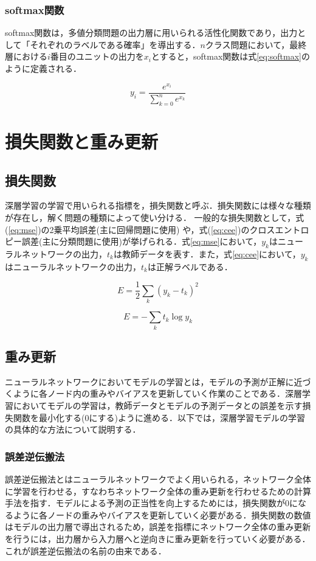 \documentclass[a4j, 11pt]{jreport}
\begin{document}
\subsubsection{softmax関数}
softmax関数は，多値分類問題の出力層に用いられる活性化関数であり，出力として「それぞれのラベルである確率」を導出する．$n$クラス問題において，最終層における$i$番目のユニットの出力を$x_{i}$とすると，softmax関数は式\ref{eq:softmax}のように定義される．

\begin{equation}
 y_{i} = \frac{e^{x_{i}}}{\sum_{k=0}^{n}e^{x_{k}}}
 \label{eq:softmax}
\end{equation}

\section{損失関数と重み更新}
\subsection{損失関数}
深層学習の学習で用いられる指標を，損失関数と呼ぶ．損失関数には様々な種類が存在し，解く問題の種類によって使い分ける．
一般的な損失関数として，式(\ref{eq:mse})の2乗平均誤差(主に回帰問題に使用) や，式(\ref{eq:cee})のクロスエントロピー誤差(主に分類問題に使用)が挙げられる．式\ref{eq:mse}において，$y_{k}$はニューラルネットワークの出力，$t_{k}$は教師データを表す．また，式\ref{eq:cee}において，$y_{k}$はニューラルネットワークの出力，$t_{k}$は正解ラベルである．

\begin{equation}
	E = \frac{1}{2} \sum_{k} ({y_k} - t_k)^2
	\label{eq:mse}
\end{equation}

\begin{equation}
	E = -\sum_{k}t_{k}\log y_{k}
	\label{eq:cee}
\end{equation}

\subsection{重み更新}
ニューラルネットワークにおいてモデルの学習とは，モデルの予測が正解に近づくように各ノード内の重みやバイアスを更新していく作業のことである．深層学習においてモデルの学習は，教師データとモデルの予測データとの誤差を示す損失関数を最小化する(0にする)ように進める．以下では，深層学習モデルの学習の具体的な方法について説明する．
\subsubsection{誤差逆伝搬法}
誤差逆伝搬法とはニューラルネットワークでよく用いられる，ネットワーク全体に学習を行わせる，すなわちネットワーク全体の重み更新を行わせるための計算手法を指す．モデルによる予測の正当性を向上するためには，損失関数が0になるように各ノードの重みやバイアスを更新していく必要がある．損失関数の数値はモデルの出力層で導出されるため，誤差を指標にネットワーク全体の重み更新を行うには，出力層から入力層へと逆向きに重み更新を行っていく必要がある．これが誤差逆伝搬法の名前の由来である．
\end{document}
